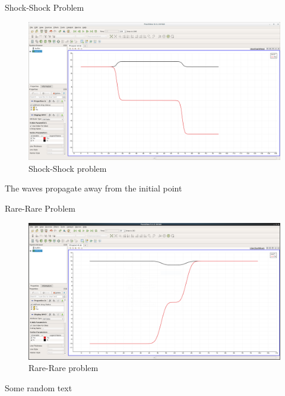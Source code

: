 \documentclass[shortpres]{beamer}
\newcommand{\imgvoffset}{-20pt}
\newcommand{\imgfullscale}{0.75}
\begin{document}
\begin{frame}{Shock-Shock Problem}
	\begin{figure}[t]
		\vspace{\imgvoffset}
		\includegraphics[clip, width=\imgfullscale\linewidth]{img/Shock-Shock.png}
		\caption*{Shock-Shock problem}
	\end{figure}
	The waves propagate away from the initial point
\end{frame}

\begin{frame}{Rare-Rare Problem}
	\begin{figure}[t]
		\vspace{\imgvoffset}
		\includegraphics[clip, width=\imgfullscale\linewidth]{img/Rare-Rare.png}
		\caption*{Rare-Rare problem}
	\end{figure}
	Some random text
\end{frame}
\end{document}
